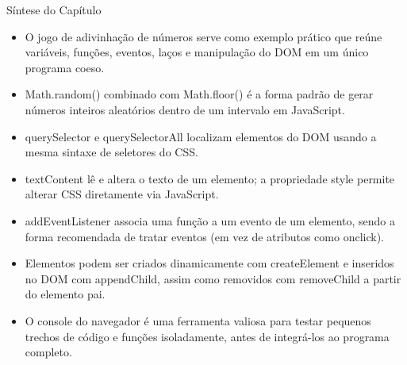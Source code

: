 Síntese do Capítulo

\begin{itemize}
  \item O jogo de adivinhação de números serve como exemplo prático que reúne variáveis, funções, eventos, laços e manipulação do DOM em um único programa coeso.
\end{itemize}

\begin{itemize}
  \item Math.random() combinado com Math.floor() é a forma padrão de gerar números inteiros aleatórios dentro de um intervalo em JavaScript.
\end{itemize}

\begin{itemize}
  \item querySelector e querySelectorAll localizam elementos do DOM usando a mesma sintaxe de seletores do CSS.
\end{itemize}

\begin{itemize}
  \item textContent lê e altera o texto de um elemento; a propriedade style permite alterar CSS diretamente via JavaScript.
\end{itemize}

\begin{itemize}
  \item addEventListener associa uma função a um evento de um elemento, sendo a forma recomendada de tratar eventos (em vez de atributos como onclick).
\end{itemize}

\begin{itemize}
  \item Elementos podem ser criados dinamicamente com createElement e inseridos no DOM com appendChild, assim como removidos com removeChild a partir do elemento pai.
\end{itemize}

\begin{itemize}
  \item O console do navegador é uma ferramenta valiosa para testar pequenos trechos de código e funções isoladamente, antes de integrá-los ao programa completo.
\end{itemize}
